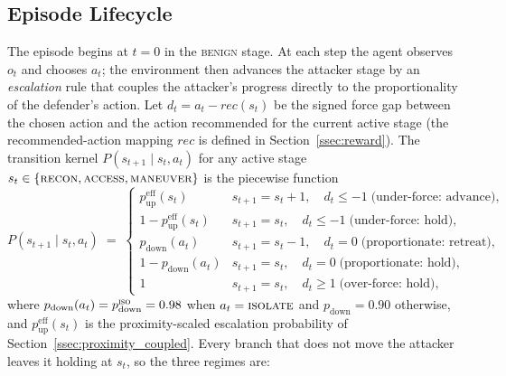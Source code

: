 \subsection{Episode Lifecycle}\label{ssec:lifecycle}
The episode begins at $t = 0$ in the \textsc{benign} stage. At each step the agent observes $o_t$ and chooses $a_t$; the environment then advances the attacker stage by an \emph{escalation} rule that couples the attacker's progress directly to the proportionality of the defender's action. Let $d_t = a_t - \mathit{rec}(s_t)$ be the signed force gap between the chosen action and the action recommended for the current active stage (the recommended-action mapping $\mathit{rec}$ is defined in Section~\ref{ssec:reward}). The transition kernel $P(s_{t+1} \mid s_t, a_t)$ for any active stage $s_t \in \{\textsc{recon}, \textsc{access}, \textsc{maneuver}\}$ is the piecewise function
\begin{equation}\label{eq:tug_of_war}
P(s_{t+1} \mid s_t, a_t) \;=\;
\begin{cases}
p_{\mathrm{up}}^{\mathrm{eff}}(s_t)     & s_{t+1} = s_t + 1, \quad d_t \leq -1 \;\text{(under-force: advance)}, \\
1 - p_{\mathrm{up}}^{\mathrm{eff}}(s_t) & s_{t+1} = s_t,     \quad d_t \leq -1 \;\text{(under-force: hold)}, \\
p_{\mathrm{down}}(a_t)                  & s_{t+1} = s_t - 1, \quad d_t = 0 \;\text{(proportionate: retreat)}, \\
1 - p_{\mathrm{down}}(a_t)              & s_{t+1} = s_t,     \quad d_t = 0 \;\text{(proportionate: hold)}, \\
1                                       & s_{t+1} = s_t,     \quad d_t \geq 1 \;\text{(over-force: hold)},
\end{cases}
\end{equation}
where $p_{\mathrm{down}}(a_t) = p_{\mathrm{down}}^{\textsc{iso}} = 0.98$ when $a_t = \textsc{isolate}$ and $p_{\mathrm{down}} = 0.90$ otherwise, and $p_{\mathrm{up}}^{\mathrm{eff}}(s_t)$ is the proximity-scaled escalation probability of Section~\ref{ssec:proximity_coupled}. Every branch that does not move the attacker leaves it holding at $s_t$, so the three regimes are:
